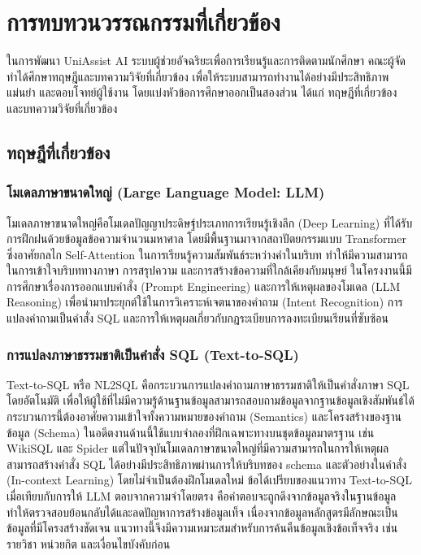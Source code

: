 \chapter{การทบทวนวรรณกรรมที่เกี่ยวข้อง}
\label{chapter:literature-review}

ในการพัฒนา UniAssist AI ระบบผู้ช่วยอัจฉริยะเพื่อการเรียนรู้และการติดตามนักศึกษา คณะผู้จัดทำได้ศึกษาทฤษฎีและบทความวิจัยที่เกี่ยวข้อง เพื่อให้ระบบสามารถทำงานได้อย่างมีประสิทธิภาพ แม่นยำ และตอบโจทย์ผู้ใช้งาน โดยแบ่งหัวข้อการศึกษาออกเป็นสองส่วน ได้แก่ ทฤษฎีที่เกี่ยวข้อง และบทความวิจัยที่เกี่ยวข้อง

\section{ทฤษฎีที่เกี่ยวข้อง}

\subsection{โมเดลภาษาขนาดใหญ่ (Large Language Model: LLM)}

โมเดลภาษาขนาดใหญ่คือโมเดลปัญญาประดิษฐ์ประเภทการเรียนรู้เชิงลึก (Deep Learning) ที่ได้รับการฝึกฝนด้วยข้อมูลข้อความจำนวนมหาศาล โดยมีพื้นฐานมาจากสถาปัตยกรรมแบบ Transformer ซึ่งอาศัยกลไก Self-Attention ในการเรียนรู้ความสัมพันธ์ระหว่างคำในบริบท \cite{vaswani2017attention} ทำให้มีความสามารถในการเข้าใจบริบททางภาษา การสรุปความ และการสร้างข้อความที่ใกล้เคียงกับมนุษย์ ในโครงงานนี้มีการศึกษาเรื่องการออกแบบคำสั่ง (Prompt Engineering) และการให้เหตุผลของโมเดล (LLM Reasoning) เพื่อนำมาประยุกต์ใช้ในการวิเคราะห์เจตนาของคำถาม (Intent Recognition) การแปลงคำถามเป็นคำสั่ง SQL และการให้เหตุผลเกี่ยวกับกฎระเบียบการลงทะเบียนเรียนที่ซับซ้อน

\subsection{การแปลงภาษาธรรมชาติเป็นคำสั่ง SQL (Text-to-SQL)}

Text-to-SQL หรือ NL2SQL คือกระบวนการแปลงคำถามภาษาธรรมชาติให้เป็นคำสั่งภาษา SQL โดยอัตโนมัติ เพื่อให้ผู้ใช้ที่ไม่มีความรู้ด้านฐานข้อมูลสามารถสอบถามข้อมูลจากฐานข้อมูลเชิงสัมพันธ์ได้ กระบวนการนี้ต้องอาศัยความเข้าใจทั้งความหมายของคำถาม (Semantics) และโครงสร้างของฐานข้อมูล (Schema) ในอดีตงานด้านนี้ใช้แบบจำลองที่ฝึกเฉพาะทางบนชุดข้อมูลมาตรฐาน เช่น WikiSQL และ Spider \cite{yu2018spider} แต่ในปัจจุบันโมเดลภาษาขนาดใหญ่ที่มีความสามารถในการให้เหตุผลสามารถสร้างคำสั่ง SQL ได้อย่างมีประสิทธิภาพผ่านการให้บริบทของ schema และตัวอย่างในคำสั่ง (In-context Learning) โดยไม่จำเป็นต้องฝึกโมเดลใหม่ ข้อได้เปรียบของแนวทาง Text-to-SQL เมื่อเทียบกับการให้ LLM ตอบจากความจำโดยตรง คือคำตอบจะถูกดึงจากข้อมูลจริงในฐานข้อมูล ทำให้ตรวจสอบย้อนกลับได้และลดปัญหาการสร้างข้อมูลเท็จ เนื่องจากข้อมูลหลักสูตรมีลักษณะเป็นข้อมูลที่มีโครงสร้างชัดเจน แนวทางนี้จึงมีความเหมาะสมสำหรับการค้นคืนข้อมูลเชิงข้อเท็จจริง เช่น รายวิชา หน่วยกิต และเงื่อนไขบังคับก่อน

